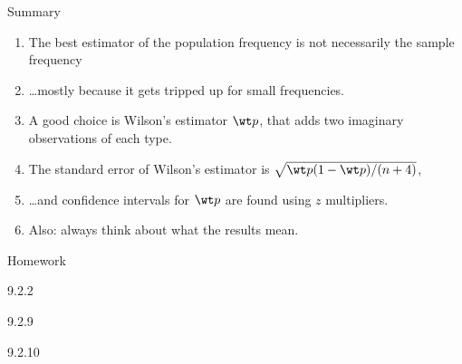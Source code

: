 \begin{frame}{Summary}
  \begin{enumerate}
      \item The best estimator of the population frequency is not necessarily the sample frequency
      \item \ldots mostly because it gets tripped up for small frequencies.
      \item A good choice is \alert{Wilson's estimator} $\wt p$, that adds two imaginary observations of each type.
      \item The standard error of Wilson's estimator is $\sqrt{ \wt p (1-\wt p) / (n+4) }$,
      \item \ldots and confidence intervals for $\wt p$ are found using $z$ multipliers.
      \item Also: always think about what the results mean.
  \end{enumerate}
\end{frame}

\begin{frame}{Homework}
  \begin{center}

  9.2.2

  \vspace{2em}

  9.2.9

  \vspace{2em}

  9.2.10

  \end{center}
\end{frame}








